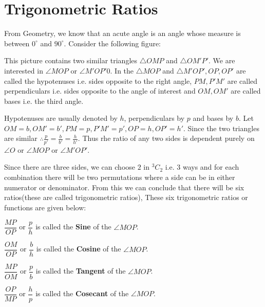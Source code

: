 \chapter{Trigonometric Ratios}
From Geometry, we know that an acute angle is an angle whose measure is between $0^\circ$ and $90^\circ$. Consider the following
figure:
\begin{center}
\end{center}

This picture contains two similar triangles $\triangle OMP$ and $\triangle OM'P'$. We are interested in $\angle MOP$ or $\angle
M'OP'0$. In the $\triangle MOP$ and $\triangle M'OP', OP, OP'$ are called the hypotenuses i.e. sides opposite to the right angle,
$PM, P'M'$ are called perpendiculars i.e. sides opposite to the angle of interest and $OM, OM'$ are called bases i.e. the third
angle.

Hypotenuses are usually denoted by $h$, perpendiculars by $p$ and bases by $b$. Let $OM = b, OM' = b', PM=p, P'M' = p', OP = h, OP'
= h'$. Since the two triangles are similar $\therefore \frac{p}{p'} = \frac{b}{b'} = \frac{h}{h'}$. Thus rhe ratio of any two sides
is dependent purely on $\angle O$ or $\angle MOP$ or $\angle M'OP'$.

Since there are three sides, we can choose $2$ in ${}^3C_2$ i.e. $3$ ways and for each combination there will be two permutations
where a side can be in either numerator or denominator. From this we can conclude that there will be six ratios(these are called
trigonometric ratios), These six trigonometric ratios or functions are given below:

$\dfrac{MP}{OP}$ or $\dfrac{p}{h}$ is called the {\bf Sine} of the $\angle MOP$.

$\dfrac{OM}{OP}$ or $\dfrac{b}{h}$ is called the {\bf Cosine} of the $\angle MOP$.

$\dfrac{MP}{OM}$ or $\dfrac{p}{b}$ is called the {\bf Tangent} of the $\angle MOP$.

$\dfrac{OP}{MP}$ or $\dfrac{h}{p}$ is called the {\bf Cosecant} of the $\angle MOP$.

